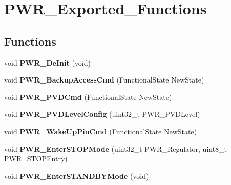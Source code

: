\hypertarget{group__PWR__Exported__Functions}{
\section{PWR\_\-Exported\_\-Functions}
\label{group__PWR__Exported__Functions}
}
\subsection*{Functions}
\begin{DoxyCompactItemize}
\item 
\hypertarget{group__PWR__Exported__Functions_gad03a0aac7bc3bc3a9fd012f3769a6990}{
void {\bfseries PWR\_\-DeInit} (void)}
\label{group__PWR__Exported__Functions_gad03a0aac7bc3bc3a9fd012f3769a6990}

\item 
\hypertarget{group__PWR__Exported__Functions_ga0741aea35572b1a75f82b74de12df800}{
void {\bfseries PWR\_\-BackupAccessCmd} (FunctionalState NewState)}
\label{group__PWR__Exported__Functions_ga0741aea35572b1a75f82b74de12df800}

\item 
\hypertarget{group__PWR__Exported__Functions_ga42cad476b816e0a33594a933b3ed1acd}{
void {\bfseries PWR\_\-PVDCmd} (FunctionalState NewState)}
\label{group__PWR__Exported__Functions_ga42cad476b816e0a33594a933b3ed1acd}

\item 
\hypertarget{group__PWR__Exported__Functions_ga237c143ef6aa55abb8049fa7bf24ab8f}{
void {\bfseries PWR\_\-PVDLevelConfig} (uint32\_\-t PWR\_\-PVDLevel)}
\label{group__PWR__Exported__Functions_ga237c143ef6aa55abb8049fa7bf24ab8f}

\item 
\hypertarget{group__PWR__Exported__Functions_gae5fd6f9336ef8c60d5483651cb0d1a00}{
void {\bfseries PWR\_\-WakeUpPinCmd} (FunctionalState NewState)}
\label{group__PWR__Exported__Functions_gae5fd6f9336ef8c60d5483651cb0d1a00}

\item 
\hypertarget{group__PWR__Exported__Functions_ga694676ac06a9baf50eae45adae0118ab}{
void {\bfseries PWR\_\-EnterSTOPMode} (uint32\_\-t PWR\_\-Regulator, uint8\_\-t PWR\_\-STOPEntry)}
\label{group__PWR__Exported__Functions_ga694676ac06a9baf50eae45adae0118ab}

\item 
\hypertarget{group__PWR__Exported__Functions_ga00ddae00a9c327b81b24d2597b0052f3}{
void {\bfseries PWR\_\-EnterSTANDBYMode} (void)}
\label{group__PWR__Exported__Functions_ga00ddae00a9c327b81b24d2597b0052f3}


\end{DoxyCompactItemize}
